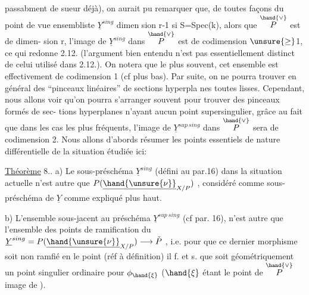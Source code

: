 
passabment de sueur déjà), on aurait pu remarquer que,  de
toutes façons du point de vue ensembliste $\underline{Y}^{sing}$  dimen%
sion r-1  si S=Spec(k), alors que $\overset{\hand{\vee}}{P}$ est de dimen-%
sion r,  l'image de $\underline{Y}^{sing}$ dans $\overset{\hand{\vee}}{P}$ est de codimension $\unsure{\geq}$1, ce qui redonne
2.12. (l'argument bien entendu n'est pas essentiellement distinct de
celui utilisé dans 2.12.). On notera que le plus souvent, cet ensemble
est effectivement de codimension 1 (cf plus bas). Par suite, on ne
pourra trouver en général des ``pinceaux linéaires'' de sections hyperpla%
nes toutes   lisses. Cependant, nous allons voir qu'on
pourra s'arranger souvent pour  trouver des pinceaux formés de sec-%
tions hyperplanes n'ayant aucun point supersingulier, grâce au fait que
dans les cas les plus fréquents, l'image de $\underline{Y}^{sup\ sing}$ dans $\overset{\hand{\vee}}{P}$ sera de
codimension 2. Nous allons d'abords résumer les points essentiels
de nature différentielle de la situation étudiée ici:

\uline{Théorème} 8.. a) Le sous-préschéma $\underline{Y}^{sing}$ (défini au par.16) dans
la situation actuelle n'est autre que $P(\underline{\hand{\unsure{\nu}}}_{X/P})$ , considéré comme
sous-préschéma de $\underline{Y}$ comme expliqué plus haut.

b) L'ensemble sous-jacent au préschéma $\underline{Y}^{sup\ sing}$ (cf par. 16), 
 n'est autre que l'ensemble des points de ramification du 
$\underline{Y}^{sing} = P(\underline{\hand{\unsure{\nu}}}_{X/P}) \longrightarrow \check{P}$ , i.e. pour que ce dernier morphisme soit
non ramfié en le point  (réf à définition) il f. et s. que 
soit géométriquement un point singulier ordinaire pour $\phi_{\hand{\xi}}$ ($\hand{\xi}$ étant le
point de $\overset{\hand{\vee}}{P}$ image de  ).

